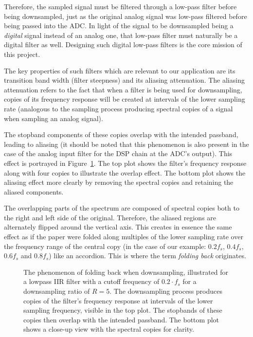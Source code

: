 Therefore,  the sampled  signal must  be  filtered through  a low-pass  filter
before  being downsampled,  just as  the original  analog signal  was low-pass
filtered  before being  passed into  the  ADC. In light  of the  signal to  be
downsampled  being a  \emph{digital} signal  instead  of an  analog one,  that
low-pass filter  must naturally  be a digital  filter as  well. Designing such
digital low-pass filters is the core mission of this project.

The key properties  of such filters which are relevant  to our application are
its transition  band width  (filter steepness)  and its  aliasing attenuation.
The aliasing attenuation refers  to the fact that when a  filter is being used
for  downsampling,  copies  of  its  frequency response  will  be  created  at
intervals  of the  lower  sampling  rate (analogous  to  the sampling  process
producing spectral copies of a signal when sampling an analog signal).

The stopband  components of these  copies overlap with the  intended passband,
leading to aliasing  (it should be noted that this  phenomenon is also present
in  the case  of  the analog  input  filter for  the DSP  chain  at the  ADC's
output). This effect is  portrayed in Figure~\ref{fig:aliasing:iirCopies}. The
top  plot shows  the filter's  frequency response  along with  four copies  to
illustrate the overlap effect. The bottom  plot shows the aliasing effect more
clearly by removing the spectral copies and retaining the aliased components.

The overlapping parts of the spectrum  are composed of spectral copies both to
the right  and left side of  the original. Therefore, the aliased  regions are
alternately flipped around the vertical axis. This creates in essence the same
effect  as if  the paper  were folded  along multiples  of the  lower sampling
rate  over the  frequency  range of  the  central  copy (in  the  case of  our
example: $0.2f_s$, $0.4f_s$, $0.6f_s$ and $0.8f_s$) like an accordion. This is
where the term \emph{folding back} originates.

\begin{figure}
    \centering
    
    \caption[Folding Back of Stopband Components Into Passband]{%
        The phenomenon  of folding back  when downsampling, illustrated  for a
        lowpass IIR  filter with a  cutoff frequency  of $0.2\cdot f_s$  for a
        downsampling ratio of $R=5$.  The downsampling process produces copies
        of the filter's frequency response  at intervals of the lower sampling
        frequency, visible  in the  top plot.  The  stopbands of  these copies
        then  overlap with  the intended  passband.  The  bottom plot  shows a
        close-up view with the spectral copies for clarity.%
    }
    \label{fig:aliasing:iirCopies}
\end{figure}

